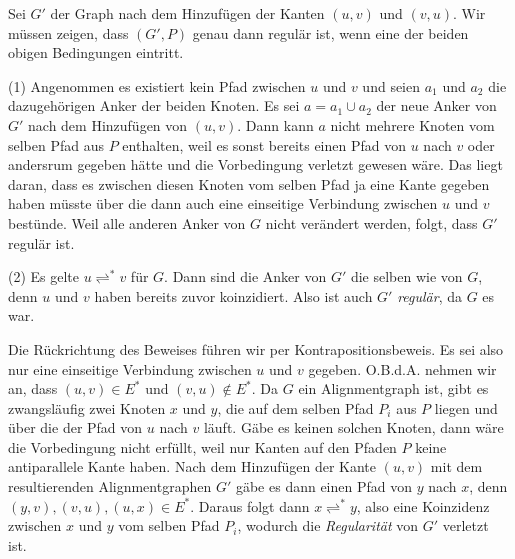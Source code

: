 \begin{beweis}
	Sei $G'$ der Graph nach dem Hinzufügen der Kanten $(u,v)$ und $(v,u)$. Wir müssen zeigen, dass $(G',P)$ genau dann regulär ist, wenn eine der beiden obigen Bedingungen eintritt.
	
	\bewhin (1) Angenommen es existiert kein Pfad zwischen $u$ und $v$ und seien $a_1$ und $a_2$ die dazugehörigen Anker der beiden Knoten. Es sei $a = a_1 \cup a_2$ der neue Anker von $G'$ nach dem Hinzufügen von $(u,v)$. Dann kann $a$ nicht mehrere Knoten vom selben Pfad aus $P$ enthalten, weil es sonst bereits einen Pfad von $u$ nach $v$ oder andersrum gegeben hätte und die Vorbedingung verletzt gewesen wäre. Das liegt daran, dass es zwischen diesen Knoten vom selben Pfad ja eine Kante gegeben haben müsste über die dann auch eine einseitige Verbindung zwischen $u$ und $v$ bestünde. Weil alle anderen Anker von $G$ nicht verändert werden, folgt, dass $G'$ regulär ist.
	
	(2) Es gelte $u \rightleftharpoons^{*} v$ für $G$. Dann sind die Anker von $G'$ die selben wie von $G$, denn $u$ und $v$ haben bereits zuvor koinzidiert. Also ist auch $G'$ \emph{regulär}, da $G$ es war.
	
	\bewrueck Die Rückrichtung des Beweises führen wir per Kontrapositionsbeweis. Es sei also nur eine einseitige Verbindung zwischen $u$ und $v$ gegeben. O.B.d.A. nehmen wir an, dass $(u,v) \in E^{*}$ und $(v,u) \notin E^{*}$. Da $G$ ein Alignmentgraph ist, gibt es zwangsläufig zwei Knoten $x$ und $y$, die auf dem selben Pfad $P_i$ aus $P$ liegen und über die der Pfad von $u$ nach $v$ läuft. Gäbe es keinen solchen Knoten, dann wäre die Vorbedingung nicht erfüllt, weil nur Kanten auf den Pfaden $P$ keine antiparallele Kante haben. Nach dem Hinzufügen der Kante $(u,v)$ mit dem resultierenden Alignmentgraphen $G'$ gäbe es dann einen Pfad von $y$ nach $x$, denn $(y,v), (v,u), (u,x) \in E^{*}$. Daraus folgt dann $x \rightleftharpoons^{*} y$, also eine Koinzidenz zwischen $x$ und $y$ vom selben Pfad $P_i$, wodurch die \emph{Regularität} von $G'$ verletzt ist.
\end{beweis}

